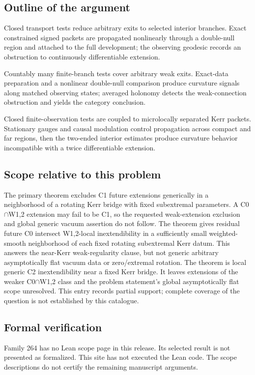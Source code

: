 \documentclass[11pt]{article}
\begin{document}
\subsection{Outline of the argument}
Closed transport tests reduce arbitrary exits to selected interior branches. Exact constrained signed packets are propagated nonlinearly through a double-null region and attached to the full development; the observing geodesic records an obstruction to continuously differentiable extension.

Countably many finite-branch tests cover arbitrary weak exits. Exact-data preparation and a nonlinear double-null comparison produce curvature signals along matched observing states; averaged holonomy detects the weak-connection obstruction and yields the category conclusion.

Closed finite-observation tests are coupled to microlocally separated Kerr packets. Stationary gauges and causal modulation control propagation across compact and far regions, then the two-ended interior estimates produce curvature behavior incompatible with a twice differentiable extension.

\subsection{Scope relative to this problem}
The primary theorem excludes C1 future extensions generically in a neighborhood of a rotating Kerr bridge with fixed subextremal parameters. A C0\(\cap\)W1,2 extension may fail to be C1, so the requested weak-extension exclusion and global generic vacuum assertion do not follow. The theorem gives residual future C0 intersect W1,2-local inextendibility in a sufficiently small weighted-smooth neighborhood of each fixed rotating subextremal Kerr datum. This answers the near-Kerr weak-regularity clause, but not generic arbitrary asymptotically flat vacuum data or zero/extremal rotation. The theorem is local generic C2 inextendibility near a fixed Kerr bridge. It leaves extensions of the weaker C0\(\cap\)W1,2 class and the problem statement’s global asymptotically flat scope unresolved. This entry records partial support; complete coverage of the question is not established by this catalogue.

\subsection{Formal verification}
Family 264 has no Lean scope page in this release. Its selected result is not presented as formalized. This site has not executed the Lean code. The scope descriptions do not certify the remaining manuscript arguments.
\end{document}
